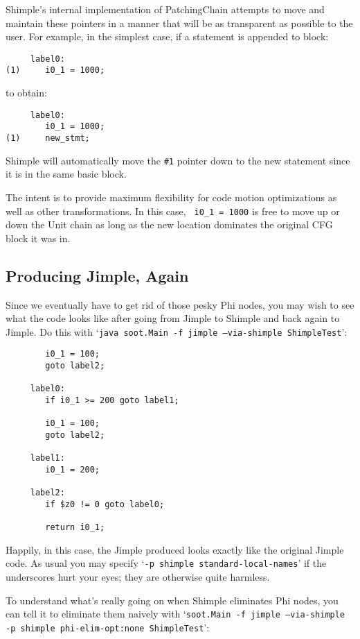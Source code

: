 \documentclass[10pt,letterpaper,oneside,onecolumn]{article}
\begin{document}
Shimple's internal implementation of PatchingChain attempts to move
and maintain these pointers in a manner that will be as transparent as
possible to the user.  For example, in the simplest case, if a
statement is appended to block:

\begin{verbatim}
     label0:
(1)     i0_1 = 1000;
\end{verbatim}

to obtain:

\begin{verbatim}
     label0:
        i0_1 = 1000;
(1)     new_stmt;
\end{verbatim}

Shimple will automatically move the {\tt \#1} pointer down to the new
statement since it is in the same basic block.

The intent is to provide maximum flexibility for code motion
optimizations as well as other transformations.  In this case, {\tt
i0\_1 = 1000} is free to move up or down the Unit chain as long as the
new location dominates the original CFG block it was in.

\subsection{Producing Jimple, Again}

Since we eventually have to get rid of those pesky Phi nodes, you
may wish to see what the code looks like after going from Jimple to
Shimple and back again to Jimple.  Do this with `{\tt java soot.Main -f
jimple --via-shimple ShimpleTest}':

\begin{verbatim}
        i0_1 = 100;
        goto label2;

     label0:
        if i0_1 >= 200 goto label1;

        i0_1 = 100;
        goto label2;

     label1:
        i0_1 = 200;

     label2:
        if $z0 != 0 goto label0;

        return i0_1;
\end{verbatim}

Happily, in this case, the Jimple produced looks exactly like the
original Jimple code.  As usual you may specify `{\tt -p shimple
standard-local-names}' if the underscores hurt your eyes; they are
otherwise quite harmless.

To understand what's really going on when Shimple eliminates Phi
nodes, you can tell it to eliminate them naively with `{\tt soot.Main
-f jimple --via-shimple -p shimple phi-elim-opt:none ShimpleTest}':
\end{document}
